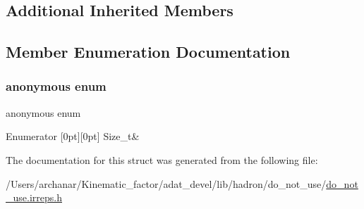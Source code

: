 \subsection*{Additional Inherited Members}


\subsection{Member Enumeration Documentation}
\mbox{\label{structHadron_1_1ZeroHelicityRep_aacdc790afcd692fa3a1b3dd8980bfc7b}} 
\subsubsection{\texorpdfstring{anonymous enum}{anonymous enum}}
{\footnotesize\ttfamily anonymous enum}

\begin{DoxyEnumFields}{Enumerator}
[0pt][0pt]{}\mbox{\label{structHadron_1_1ZeroHelicityRep_aacdc790afcd692fa3a1b3dd8980bfc7ba6f7f0a44bfc6c8b00477c0c8fa069d8e}} 
Size\+\_\+t&\\
\hline

\end{DoxyEnumFields}


The documentation for this struct was generated from the following file\+:\begin{DoxyCompactItemize}
\item 
/\+Users/archanar/\+Kinematic\+\_\+factor/adat\+\_\+devel/lib/hadron/do\+\_\+not\+\_\+use/\mbox{\hyperlink{do__not__use_8irreps_8h}{do\+\_\+not\+\_\+use.\+irreps.\+h}}\end{DoxyCompactItemize}
